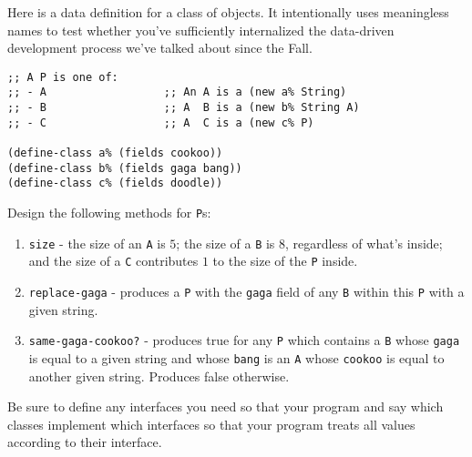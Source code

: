 \documentclass[12pt]{article}                   %
\def\pts#1{\marginpar{\footnotesize \raggedright  \fbox{#1 {\sc Points}}}}
\begin{document}
\vfill\thispagestyle{empty}
\newpage

\fi






\begin{problem}\pts{17} %

Here is a data definition for a class of objects.  It intentionally
uses meaningless names to test whether you've sufficiently
internalized the data-driven development process we've talked about
since the Fall.

\begin{verbatim}
;; A P is one of:          
;; - A                  ;; An A is a (new a% String)
;; - B                  ;; A  B is a (new b% String A)
;; - C                  ;; A  C is a (new c% P)

(define-class a% (fields cookoo))
(define-class b% (fields gaga bang))
(define-class c% (fields doodle))
\end{verbatim}

\noindent
Design the following methods for \verb|P|s:

\begin{enumerate}

\item \verb|size| - the size of an \verb|A| is $5$; the size of a
  \verb|B| is $8$, regardless of what's inside; and the size of a
  \verb|C| contributes $1$ to the size of the \verb|P| inside.

\item \verb|replace-gaga| - produces a \verb|P| with the \verb|gaga|
  field of any \verb|B| within this \verb|P| with a given string.

\item \verb|same-gaga-cookoo?| - produces true for any \verb|P| which
  contains a \verb|B| whose \verb|gaga| is equal to a given string and
  whose \verb|bang| is an \verb|A| whose \verb|cookoo| is equal to
  another given string.  Produces false otherwise.

\end{enumerate}

Be sure to define any interfaces you need so that your program and say
which classes implement which interfaces so that your program treats
all values according to their interface.


\end{problem}
\end{document}
